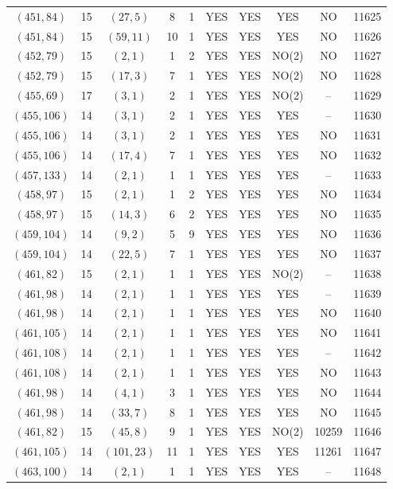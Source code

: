 \begin{longtable}{|c|c|c|c|c|c|c|c|c|c|}
$(451, 84)$ & 15 & $(27, 5)$ & 8 & 1 & YES & YES & YES & NO & 11625\\
$(451, 84)$ & 15 & $(59, 11)$ & 10 & 1 & YES & YES & YES & NO & 11626\\
$(452, 79)$ & 15 & $(2, 1)$ & 1 & 2 & YES & YES & NO(2) & NO & 11627\\
$(452, 79)$ & 15 & $(17, 3)$ & 7 & 1 & YES & YES & NO(2) & NO & 11628\\
$(455, 69)$ & 17 & $(3, 1)$ & 2 & 1 & YES & YES & NO(2) & -- & 11629\\
$(455, 106)$ & 14 & $(3, 1)$ & 2 & 1 & YES & YES & YES & -- & 11630\\
$(455, 106)$ & 14 & $(3, 1)$ & 2 & 1 & YES & YES & YES & NO & 11631\\
$(455, 106)$ & 14 & $(17, 4)$ & 7 & 1 & YES & YES & YES & NO & 11632\\
$(457, 133)$ & 14 & $(2, 1)$ & 1 & 1 & YES & YES & YES & -- & 11633\\
$(458, 97)$ & 15 & $(2, 1)$ & 1 & 2 & YES & YES & YES & NO & 11634\\
$(458, 97)$ & 15 & $(14, 3)$ & 6 & 2 & YES & YES & YES & NO & 11635\\
$(459, 104)$ & 14 & $(9, 2)$ & 5 & 9 & YES & YES & YES & NO & 11636\\
$(459, 104)$ & 14 & $(22, 5)$ & 7 & 1 & YES & YES & YES & NO & 11637\\
$(461, 82)$ & 15 & $(2, 1)$ & 1 & 1 & YES & YES & NO(2) & -- & 11638\\
$(461, 98)$ & 14 & $(2, 1)$ & 1 & 1 & YES & YES & YES & -- & 11639\\
$(461, 98)$ & 14 & $(2, 1)$ & 1 & 1 & YES & YES & YES & NO & 11640\\
$(461, 105)$ & 14 & $(2, 1)$ & 1 & 1 & YES & YES & YES & NO & 11641\\
$(461, 108)$ & 14 & $(2, 1)$ & 1 & 1 & YES & YES & YES & -- & 11642\\
$(461, 108)$ & 14 & $(2, 1)$ & 1 & 1 & YES & YES & YES & NO & 11643\\
$(461, 98)$ & 14 & $(4, 1)$ & 3 & 1 & YES & YES & YES & NO & 11644\\
$(461, 98)$ & 14 & $(33, 7)$ & 8 & 1 & YES & YES & YES & NO & 11645\\
$(461, 82)$ & 15 & $(45, 8)$ & 9 & 1 & YES & YES & NO(2) & 10259 & 11646\\
$(461, 105)$ & 14 & $(101, 23)$ & 11 & 1 & YES & YES & YES & 11261 & 11647\\
$(463, 100)$ & 14 & $(2, 1)$ & 1 & 1 & YES & YES & YES & -- & 11648\\

\end{longtable}
